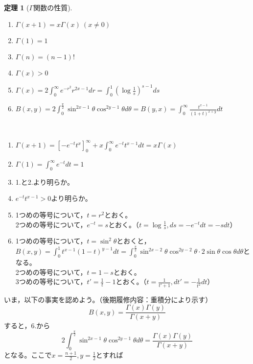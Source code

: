 \documentclass[dvipdfmx,a4j,10pt]{jsarticle}
\makeatletter
\theoremstyle{mystyle1}
\theoremstyle{mystyle2}
\newtheorem{thm*}{定理}
\renewenvironment{proof}[1][\proofname]{\par
  \pushQED{\qed}%
  \normalfont
  \topsep6\p@\@plus6\p@ \trivlist
  \item[\hskip\labelsep{\bfseries\sffamily #1}]\ignorespaces
}{%
  \popQED\endtrivlist\@endpefalse
}
\renewcommand\proofname{証明}
\makeatother
\begin{document}
\begin{proof}[例\ref{ex-beta}の証明]
\begin{thm*}[$\Gamma$関数の性質]\
    \vspace{-\baselineskip}
    \begin{enumerate}
    \item $\displaystyle\Gamma(x+1)=x\Gamma(x)\ (x\neq0)$
    \item $\displaystyle\Gamma(1)=1$
    \item $\displaystyle\Gamma(n)=(n-1)!$
    \item $\displaystyle\Gamma(x)>0$
    \item $\displaystyle\Gamma(x)=2\int_0^\infty e^{-r^2} r^{2x-1}dr=\int_0^1\left(\log{\frac{1}{s}}\right)^{s-1}ds$
    \item $\displaystyle B(x,y)=2\int_0^{\frac{\pi}{2}}\sin^{2x-1}\theta\cos^{2y-1}\theta d\theta=B(y,x)=\int_0^\infty\frac{t^{x-1}}{(1+t)^{x+y}}dt$
    \end{enumerate}
\end{thm*}
\begin{proof}\
\begin{enumerate}
\item $\displaystyle\Gamma(x+1)=[-e^{-t}t^x]_0^\infty+x\int_0^\infty e^{-t}t^{x-1}dt=x\Gamma(x)$
\item $\displaystyle\Gamma(1)=\int_0^\infty e^{-t}dt=1$
\item 1.と2.より明らか。
\item $e^{-t}t^{x-1}>0$より明らか。
\item 1つめの等号について，$t=r^2$とおく。\\2つめの等号について，$e^{-t}=s$とおく。（$\displaystyle t=\log\frac{1}{s},ds=-e^{-t}dt=-sdt$）
\item 1つめの等号について，$t=\sin^2\theta$とおくと，\\$\displaystyle B(x,y)=\int_0^1 t^{x-1}(1-t)^{y-1}dt=\int_0^{\frac{\pi}{2}}\sin^{2x-2}\theta\cos^{2y-2}\theta\cdot2\sin\theta\cos\theta d\theta$となる。\\2つめの等号について，$t=1-s$とおく。\\3つめの等号について，$\displaystyle t'=\frac{1}{t}-1$とおく。（$\displaystyle t=\frac{1}{t'+1},dt'=-\frac{1}{t^2}dt$）
\end{enumerate}
\end{proof}
いま，以下の事実を認めよう。（後期履修内容：重積分により示す）
\[
B(x,y)=\frac{\Gamma(x)\Gamma(y)}{\Gamma(x+y)}
\]
すると，6.から
\[
2\int_0^{\frac{\pi}{2}}\sin^{2x-1}\theta\cos^{2y-1}\theta d\theta= \frac{\Gamma(x)\Gamma(y)}{\Gamma(x+y)}
\]
となる。ここで$\displaystyle x=\frac{n+1}{2},y=\frac{1}{2}$とすれば

\end{proof}
\end{document}
